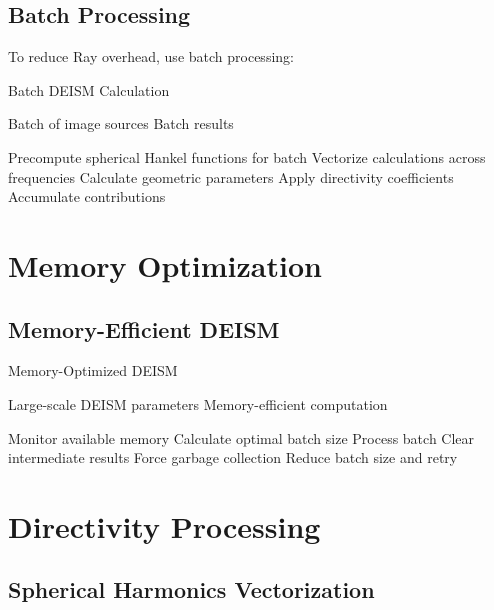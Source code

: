 \documentclass[11pt,a4paper]{article}
\begin{document}
\subsection{Batch Processing}

To reduce Ray overhead, use batch processing:
\begin{algorithm}[H]
\caption{Batch DEISM Calculation}
\begin{algorithmic}[1]
\Require Batch of image sources
\Ensure Batch results

\State Precompute spherical Hankel functions for batch
\State Vectorize calculations across frequencies
    \State Calculate geometric parameters
    \State Apply directivity coefficients
    \State Accumulate contributions
\EndFor
\end{algorithmic}
\end{algorithm}

\section{Memory Optimization}

\subsection{Memory-Efficient DEISM}

\begin{algorithm}[H]
\caption{Memory-Optimized DEISM}
\begin{algorithmic}[1]
\Require Large-scale DEISM parameters
\Ensure Memory-efficient computation

\State Monitor available memory
\State Calculate optimal batch size
        \State Process batch
        \State Clear intermediate results
        \State Force garbage collection
    \Else
        \State Reduce batch size and retry
    \EndIf
\EndFor
\end{algorithmic}
\end{algorithm}

\section{Directivity Processing}

\subsection{Spherical Harmonics Vectorization}
\end{document}
